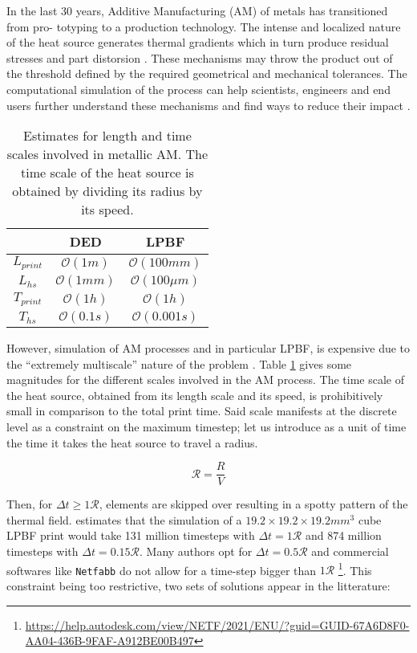 In the last 30 years, Additive Manufacturing (AM) of metals has transitioned from pro-
totyping to a production technology. The intense and localized nature of the heat source
generates thermal gradients which in turn produce residual stresses and part distorsion \cite{Fu2014}.
These mechanisms may throw the product out of the threshold defined by the required geometrical
and mechanical tolerances. The computational simulation of the process can help
scientists, engineers and end users further understand these mechanisms and find ways to
reduce their impact \cite{Lu2022}.\par

\begin{table}[h]
  \centering
  \begin{tabular}{|c|c|c|}
    \hline
    & DED & LPBF \\
    \hline
    $L_{print}$ & $\mathcal{O}(1 m   )$ &  $\mathcal{O}(100 mm    )$  \\
    $L_{hs}$    & $\mathcal{O}(1 mm  )$ &  $\mathcal{O}(100 \mu m)$  \\
    $T_{print}$ & $\mathcal{O}(1 h   )$ &  $\mathcal{O}(1 h       )$  \\
    $T_{hs}$    & $\mathcal{O}(0.1 s )$ &  $\mathcal{O}(0.001 s  )$  \\
    \hline
  \end{tabular}
  \caption{Estimates for length and time scales involved in metallic AM. The time
  scale of the heat source is obtained by dividing its radius by its
  speed.}
  \label{tbl:scales}
\end{table}

However, simulation of AM processes and in particular LPBF, is
expensive due to the ``extremely multiscale'' nature
of the problem \cite{Hodge2021}.
Table \ref{tbl:scales}
gives some magnitudes for the different scales involved in the AM process.
The time scale of the heat source, obtained from its length scale and its speed,
is prohibitively small in comparison to the total print time.
Said scale manifests at the discrete level
as a constraint on the maximum timestep; let us introduce
as a unit of time the time it takes the heat source to travel a radius.

\begin{equation}\label{eq:trad}
\mathcal{R} = \frac{R}{V}
\end{equation}

Then, for $\Delta t \geq 1 \mathcal{R}$, elements are skipped over resulting
in a spotty pattern of the thermal field.
\cite{Hodge2021} estimates that the simulation of a
$19.2 \times 19.2 \times 19.2 mm^3$ cube LPBF print would take 
131 million timesteps with $\Delta t = 1 \mathcal{R}$ and
874 million timesteps with $\Delta t = 0.15 \mathcal{R}$.
Many authors opt for
$\Delta t = 0.5\mathcal{R}$ \cite{Patil2021, Michaleris2014, Stender2018}
and commercial softwares like \texttt{Netfabb}
do not allow for a time-step bigger than $1 \mathcal{R}$
\footnote{\url{https://help.autodesk.com/view/NETF/2021/ENU/?guid=GUID-67A6D8F0-AA04-436B-9FAF-A912BE00B497}}.
This constraint being too restrictive, two sets of solutions
appear in the litterature:

